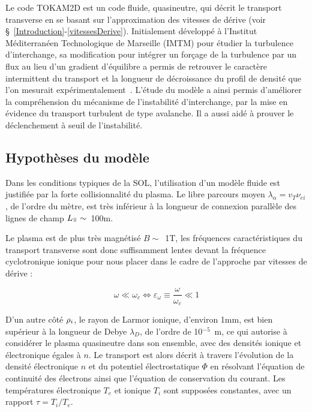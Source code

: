 \begin{refsection}
Le code TOKAM2D est un code fluide, quasineutre, qui décrit le transport
transverse en se basant sur l'approximation des vitesses de dérive (voir
\S~\ref{Introduction}-\ref{vitessesDerive}). Initialement développé à
l'Institut Méditerranéen Technologique de Marseille (IMTM) pour étudier la
turbulence d'interchange, sa modification pour intégrer un forçage de la
turbulence par un flux au lieu d'un gradient d'équilibre a permis de retrouver
le caractère intermittent du transport et la longueur de décroissance du profil
de densité que l'on mesurait expérimentalement~\cite{SarazinPhD}. L'étude du
modèle a ainsi permis d'améliorer la compréhension du mécanisme de
l'instabilité d'interchange, par la mise en évidence du transport turbulent de
type avalanche. Il a aussi aidé à prouver le déclenchement à seuil de l'instabilité.

\subsection{Hypothèses du modèle}
Dans les conditions typiques de la SOL, l'utilisation d'un modèle fluide est
justifiée par la forte collisionnalité du plasma. Le libre parcours moyen
$\lambda_\alpha=v_T \nu_{ei}$, de l'ordre du mètre, est très inférieur à la
longueur de connexion parallèle des lignes de champ $L_\para\sim
$~100m.

Le plasma est de plus très magnétisé $B\sim$~1T, les fréquences
caractéristiques du transport transverse sont donc suffisamment lentes devant la
fréquence cyclotronique ionique pour nous placer dans le cadre de
l'approche par vitesses de dérive :

\begin{equation}
\omega\ll\omega_c\Leftrightarrow \varepsilon_\omega\equiv\frac{\omega}{\omega_c}\ll 1
\end{equation}

D'un autre côté $\rho{_{i}}$, le rayon de Larmor ionique, d'environ
1mm, est bien supérieur à la longueur de
Debye $\lambda_D$, de l'ordre de 10$^{-5}$~m, ce qui autorise à
considérer le plasma quasineutre dans son ensemble, avec des densités ionique
et électronique égales à $n$.
Le transport est alors décrit à travers l'évolution de la densité
électronique $n$ et du potentiel électrostatique $\Phi$ en résolvant l'équation
de continuité des électrons ainsi que l'équation de conservation du courant. Les
températures électronique
$T_e$ et ionique $T_i$ sont supposées constantes, avec un rapport $\tau=T_i/T_e$.


\end{refsection}
